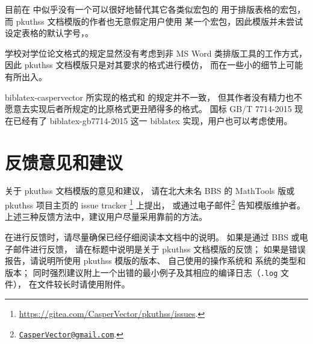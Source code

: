 目前在  中似乎没有一个可以很好地替代其它各类似宏包的
用于排版表格的宏包，而 pkuthss 文档模版的作者也无意假定用户使用
某一个宏包，因此模版并未尝试设定表格的默认字号，。

学校对学位论文格式的规定显然没有考虑到非 MS Word 类排版工具的工作方式，
因此 pkuthss 文档模版只是对其要求的格式进行模仿，
而在一些小的细节上可能有所出入。

biblatex-caspervector
所实现的格式和 \parencite{pku-thesisstyle} 的规定并不一致，
但其作者没有精力也不愿意去实现后者所规定的比原格式更丑陋得多的格式。
国标 GB/T 7714-2015 现在已经有了 biblatex-gb7714-2015%
 这一 biblatex 实现，用户也可以考虑使用。

\section{反馈意见和建议}

关于 pkuthss 文档模版的意见和建议，
请在北大未名 BBS 的 MathTools 版或 pkuthss 项目主页的 issue tracker%
\footnote{\url{https://gitea.com/CasperVector/pkuthss/issues}.}%
上提出，
或通过电子邮件\footnote%
{\href{mailto:CasperVector@gmail.com}{\texttt{CasperVector@gmail.com}}.}%
告知模版维护者。
上述三种反馈方法中，建议用户尽量采用靠前的方法。

在进行反馈时，请尽量确保已经仔细阅读本文档中的说明。
如果是通过 BBS 或电子邮件进行反馈，
请在标题中说明是关于 pkuthss 文档模版的反馈；
如果是错误报告，请说明所使用 pkuthss 模版的版本、
自己使用的操作系统和  系统的类型和版本；
同时强烈建议附上一个出错的最小例子及其相应的编译日志（\verb|.log| 文件），
在文件较长时请使用附件。

